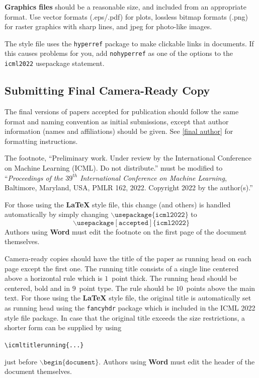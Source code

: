 \documentclass[nohyperref]{article}
\theoremstyle{plain}
\theoremstyle{definition}
\theoremstyle{remark}
\begin{document}
\textbf{Graphics files} should be a reasonable size, and included from
an appropriate format. Use vector formats (.eps/.pdf) for plots,
lossless bitmap formats (.png) for raster graphics with sharp lines, and
jpeg for photo-like images.

The style file uses the \texttt{hyperref} package to make clickable
links in documents. If this causes problems for you, add
\texttt{nohyperref} as one of the options to the \texttt{icml2022}
usepackage statement.


\subsection{Submitting Final Camera-Ready Copy}

The final versions of papers accepted for publication should follow the
same format and naming convention as initial submissions, except that
author information (names and affiliations) should be given. See
\cref{final author} for formatting instructions.

The footnote, ``Preliminary work. Under review by the International
Conference on Machine Learning (ICML). Do not distribute.'' must be
modified to ``\textit{Proceedings of the
$\mathit{39}^{th}$ International Conference on Machine Learning},
Baltimore, Maryland, USA, PMLR 162, 2022.
Copyright 2022 by the author(s).''

For those using the \textbf{\LaTeX} style file, this change (and others) is
handled automatically by simply changing
$\mathtt{\backslash usepackage\{icml2022\}}$ to
$$\mathtt{\backslash usepackage[accepted]\{icml2022\}}$$
Authors using \textbf{Word} must edit the
footnote on the first page of the document themselves.

Camera-ready copies should have the title of the paper as running head
on each page except the first one. The running title consists of a
single line centered above a horizontal rule which is $1$~point thick.
The running head should be centered, bold and in $9$~point type. The
rule should be $10$~points above the main text. For those using the
\textbf{\LaTeX} style file, the original title is automatically set as running
head using the \texttt{fancyhdr} package which is included in the ICML
2022 style file package. In case that the original title exceeds the
size restrictions, a shorter form can be supplied by using

\verb|\icmltitlerunning{...}|

just before $\mathtt{\backslash begin\{document\}}$.
Authors using \textbf{Word} must edit the header of the document themselves.
\end{document}
